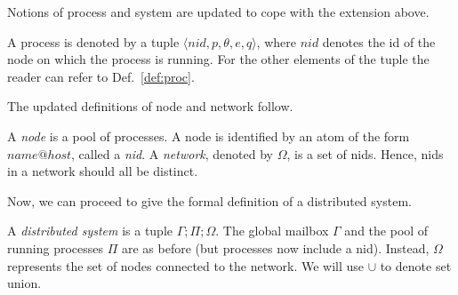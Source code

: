 \documentclass[runningheads]{llncs}
\let\l=\langle
\let\r=\rangle
\begin{document}
Notions of process and system are updated to cope with the extension above.

\begin{definition}[Process]
	A process is denoted by a tuple $\l nid, p, \theta, e, q \r$, where $nid$
  denotes the id of the node on which the process is running. For the other elements of the tuple the reader can refer to Def.~\ref{def:proc}.
\end{definition}
	
The updated definitions of node and network follow.

\begin{definition}
  A \emph{node} is a pool of processes. A node is identified by an atom of
  the form $name@host$, called a \emph{nid}. A \emph{network}, denoted by $\Omega$,
  is a set of nids. Hence, nids in a network should all be distinct.
\end{definition}  

Now, we can proceed to give the formal definition of a distributed system.

\begin{definition}
  A \emph{distributed system} is a tuple $\Gamma;\Pi;\Omega$. The global mailbox $\Gamma$ and the pool of running processes $\Pi$ are as before (but processes now include a nid).
  Instead, $\Omega$ represents the set of nodes connected to the network. We will use $\cup$ to denote set union.
\end{definition}
\end{document}
